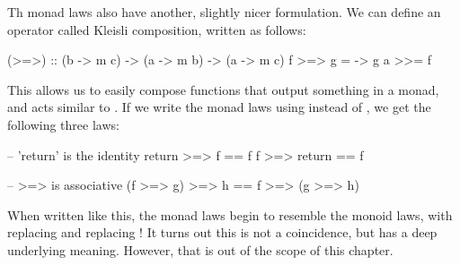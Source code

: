\begin{tangent}[frametitle=Kleisli Composition]
    Th monad laws also have another, slightly nicer formulation. We can define an operator called Kleisli
    composition, written as follows:
\begin{haskell}
(>=>) :: (b -> m c) -> (a -> m b) -> (a -> m c)
f >=> g = \a -> g a >>= f
\end{haskell}
    This allows us to easily compose functions that output something in a monad, and acts similar to
    . If we write the monad laws using \inline{>=>} instead of \inline{>>=}, we get the
    following three laws:
\begin{haskell}
-- 'return' is the identity
return >=> f == f
f >=> return == f

-- >=> is associative
(f >=> g) >=> h == f >=> (g >=> h)
\end{haskell}
    When written like this, the monad laws begin to resemble the monoid laws, with \inline{>=>}
    replacing  and  replacing ! It turns out this is not a
    coincidence, but has a deep underlying meaning. However, that is out of the scope of this chapter.
\end{tangent}


